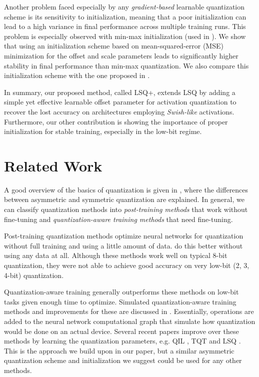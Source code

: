 \documentclass[10pt,twocolumn,letterpaper]{article}
\begin{document}
Another problem faced especially by any \textit{gradient-based} learnable quantization scheme is its sensitivity to initialization, meaning that a poor initialization can lead to a high variance in final performance across multiple training runs. This problem is especially observed with min-max initialization (used in \cite{tensorflow2015-whitepaper}). We show that using an initialization scheme based on mean-squared-error (MSE) minimization \cite{mse1,mse3} for the offset and scale parameters leads to significantly higher stability in final performance than min-max quantization. We also compare this initialization scheme with the one proposed in \cite{lsq}.

In summary, our proposed method, called LSQ+, extends LSQ \cite{lsq} by adding a simple yet effective learnable offset parameter for activation quantization to recover the lost accuracy on architectures employing \textit{Swish-like} activations. Furthermore, our other contribution is showing the importance of proper initialization for stable training, especially in the low-bit regime.










\section{Related Work}
A good overview of the basics of quantization is given in \cite{krishnamoorthi}, where the differences between asymmetric and symmetric quantization are explained. In general, we can classify quantization methods into \textit{post-training methods} that work without fine-tuning and \textit{quantization-aware training methods} that need fine-tuning. 

Post-training quantization methods \cite{banner2019,ocs2019,choukroun2019} optimize neural networks for quantization without full training and using a little amount of data. \cite{dfq,zeroq} do this better without using any data at all. Although these methods work well on typical 8-bit quantization, they were not able to achieve good accuracy on very low-bit (2, 3, 4-bit) quantization.

Quantization-aware training generally outperforms these methods on low-bit tasks given enough time to optimize.
Simulated quantization-aware training methods and improvements for these are discussed in \cite{Gupta2015,jacob2018cvpr,louizos2018relaxed}. Essentially, operations are added to the neural network computational graph that simulate how quantization would be done on an actual device. Several recent papers improve over these methods by learning the quantization parameters, e.g. QIL \cite{qil}, TQT \cite{tqt} and LSQ \cite{lsq}. This is the approach we build upon in our paper, but a similar asymmetric quantization scheme and initialization we suggest could be used for any other methods. 
\end{document}
